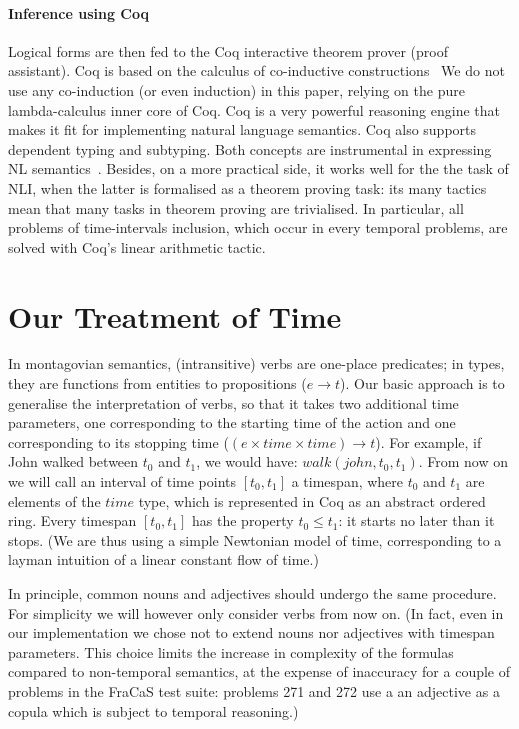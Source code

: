 \documentclass[11pt,a4paper]{article}
\begin{document}
\paragraph{Inference using Coq}
Logical forms are then fed to the 
Coq interactive theorem prover (proof assistant). Coq is based on
the calculus of co-inductive constructions~\citep{werner_une_1994} We
do not use any co-induction (or even induction) in this paper, relying
on the pure lambda-calculus inner core of Coq.  Coq is a very powerful
reasoning engine that makes it fit for implementing natural language
semantics.  Coq also supports  dependent typing and 
 subtyping. Both concepts are instrumental in expressing NL
semantics~\citep{chatzikyriakidis_natural_2014}.  Besides, on a more
practical side, it works well for the the task of NLI, when the latter
is formalised as a theorem proving task: its many tactics mean that
many tasks in theorem proving are trivialised. In particular, all
problems of time-intervals inclusion, which occur in every temporal
problems, are solved with Coq's linear arithmetic tactic.

\section{Our Treatment of Time}
\label{sec:our-semantics}

In montagovian semantics, (intransitive) verbs are one-place
predicates; in types, they are functions from entities to propositions
($e \to t$).  Our basic approach is to generalise the interpretation of 
verbs, so that it takes two
additional time parameters, one corresponding to the starting time
of the action and one corresponding to its stopping time ($(e × time × time) \to t$). For example,
if John walked between $t_0$ and $t_1$, we would have:
$walk(john,t_0,t_1)$. From now on we will call an interval of time
points $[t_0,t_1]$ a timespan, where $t_0$ and $t_1$ are elements of the $time$ type, which is represented in Coq as an abstract ordered ring. Every timespan $[t_0,t_1]$ has the
property $t_0 ≤ t_1$: it starts no later than it stops. (We are thus
using a simple Newtonian model of time, corresponding to a layman
intuition of a linear constant flow of time.)

In principle, common nouns and adjectives should undergo the same
procedure. For simplicity we will however only consider verbs from now
on. (In fact, even in our implementation we chose not to extend nouns
nor adjectives with timespan parameters. This choice limits the
increase in complexity of the formulas compared to non-temporal
semantics, at the expense of inaccuracy for a couple of problems in
the FraCaS test suite: problems 271 and 272 use a an adjective as a
copula which is subject to temporal reasoning.)
\end{document}
